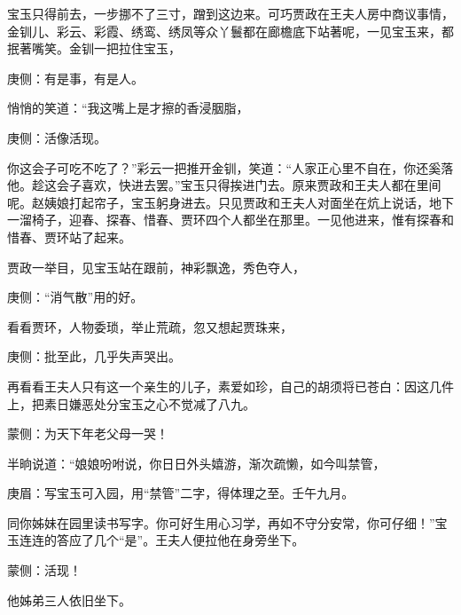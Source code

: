 \begin{parag}
    宝玉只得前去，一步挪不了三寸，蹭到这边来。可巧贾政在王夫人房中商议事情，金钏儿、彩云、彩霞、绣鸾、绣凤等众丫鬟都在廊檐底下站著呢，一见宝玉来，都抿著嘴笑。金钏一把拉住宝玉，\begin{note}庚侧：有是事，有是人。\end{note}悄悄的笑道：“我这嘴上是才擦的香浸胭脂，\begin{note}庚侧：活像活现。\end{note}你这会子可吃不吃了？”彩云一把推开金钏，笑道：“人家正心里不自在，你还奚落他。趁这会子喜欢，快进去罢。”宝玉只得挨进门去。原来贾政和王夫人都在里间呢。赵姨娘打起帘子，宝玉躬身进去。只见贾政和王夫人对面坐在炕上说话，地下一溜椅子，迎春、探春、惜春、贾环四个人都坐在那里。一见他进来，惟有探春和惜春、贾环站了起来。
\end{parag}


\begin{parag}
    贾政一举目，见宝玉站在跟前，神彩飘逸，秀色夺人，\begin{note}庚侧：“消气散”用的好。\end{note}看看贾环，人物委琐，举止荒疏，忽又想起贾珠来，\begin{note}庚侧：批至此，几乎失声哭出。\end{note}再看看王夫人只有这一个亲生的儿子，素爱如珍，自己的胡须将已苍白：因这几件上，把素日嫌恶处分宝玉之心不觉减了八九。\begin{note}蒙侧：为天下年老父母一哭！\end{note}半晌说道：“娘娘吩咐说，你日日外头嬉游，渐次疏懒，如今叫禁管，\begin{note}庚眉：写宝玉可入园，用“禁管”二字，得体理之至。壬午九月。\end{note}同你姊妹在园里读书写字。你可好生用心习学，再如不守分安常，你可仔细！”宝玉连连的答应了几个“是”。王夫人便拉他在身旁坐下。\begin{note}蒙侧：活现！\end{note}他姊弟三人依旧坐下。
\end{parag}


